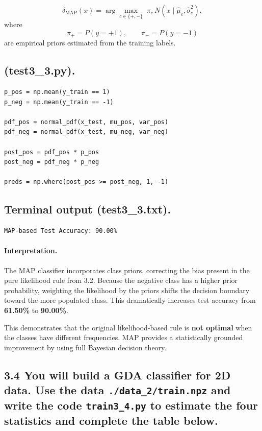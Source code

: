 \documentclass[12pt]{article}
\begin{document}
\[
\delta_{\text{MAP}}(x)
=
\arg\max_{c \in \{+,-\}}
\;\pi_c \, N(x \mid \hat{\mu}_c, \hat{\sigma}^2_c),
\]
where
\[
\pi_{+} = P(y=+1), \qquad \pi_{-} = P(y=-1)
\]
are empirical priors estimated from the training labels.

\subsection*{(test3\_3.py).}
\begin{lstlisting}
p_pos = np.mean(y_train == 1)
p_neg = np.mean(y_train == -1)

pdf_pos = normal_pdf(x_test, mu_pos, var_pos)
pdf_neg = normal_pdf(x_test, mu_neg, var_neg)

post_pos = pdf_pos * p_pos
post_neg = pdf_neg * p_neg

preds = np.where(post_pos >= post_neg, 1, -1)
\end{lstlisting}

\subsection*{Terminal output (test3\_3.txt).}
\begin{lstlisting}
MAP-based Test Accuracy: 90.00%
\end{lstlisting}

\paragraph{Interpretation.}
The MAP classifier incorporates class priors, correcting the bias present in the pure likelihood
rule from 3.2.  
Because the negative class has a higher prior probability, weighting the likelihood by the priors
shifts the decision boundary toward the more populated class.  
This dramatically increases test accuracy from \textbf{61.50\%} to \textbf{90.00\%}.

This demonstrates that the original likelihood-based rule is \textbf{not optimal} when the classes
have different frequencies. MAP provides a statistically grounded improvement by using full 
Bayesian decision theory.


\subsection*{3.4
You will build a GDA classifier for 2D data. Use the data
\texttt{./data\_2/train.npz} and write the code
\texttt{train3\_4.py} to estimate the four statistics and complete the table below.}
\end{document}
